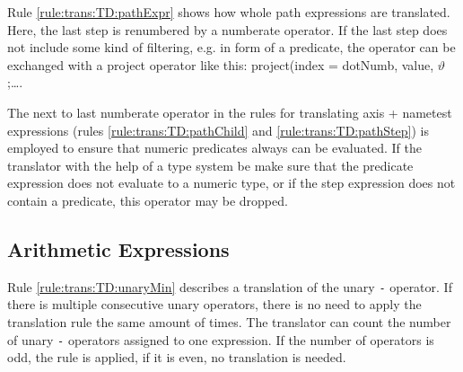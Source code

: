 Rule \ref{rule:trans:TD:pathExpr} shows how whole path expressions are translated. Here, the last step is
renumbered by a \textsf{numberate} operator. If the last step does not include some kind of filtering, e.g. in
form of a predicate, the operator can be exchanged with a \textsf{project} operator like this:
\textsf{project(index = dotNumb, value, }$\vartheta$\textsf{;\ldots}.

The next to last \textsf{numberate} operator in the rules for translating axis + nametest expressions (rules
\ref{rule:trans:TD:pathChild} and \ref{rule:trans:TD:pathStep}) is employed to ensure that numeric predicates
always can be evaluated. If the translator with the help of a type system be make sure that the predicate
expression does not evaluate to a numeric type, or if the step expression does not contain a predicate, this
operator may be dropped.

\subsection{Arithmetic Expressions}
\label{sect:trans:TD:simpl:arith}

Rule \ref{rule:trans:TD:unaryMin} describes a translation of the unary \texttt{-} operator. If there is multiple
consecutive unary operators, there is no need to apply the translation rule the same amount of times. The
translator can count the number of unary \texttt{-} operators assigned to one expression. If the number of
operators is odd, the rule is applied, if it is even, no translation is needed.
